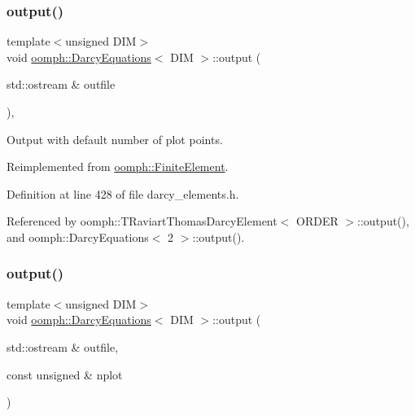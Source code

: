 \mbox{\label{classoomph_1_1DarcyEquations_ac523da40b92a26e3d32c1a5e985e0d40}} 
\subsubsection{\texorpdfstring{output()}{output()}\hspace{0.1cm}{\footnotesize\ttfamily [1/2]}}
{\footnotesize\ttfamily template$<$unsigned D\+IM$>$ \\
void \hyperlink{classoomph_1_1DarcyEquations}{oomph\+::\+Darcy\+Equations}$<$ D\+IM $>$\+::output (\begin{DoxyParamCaption}\item[{std\+::ostream \&}]{outfile }\end{DoxyParamCaption})\hspace{0.3cm}{\ttfamily [inline]}, {\ttfamily [virtual]}}



Output with default number of plot points. 



Reimplemented from \hyperlink{classoomph_1_1FiniteElement_a2ad98a3d2ef4999f1bef62c0ff13f2a7}{oomph\+::\+Finite\+Element}.



Definition at line 428 of file darcy\+\_\+elements.\+h.



Referenced by oomph\+::\+T\+Raviart\+Thomas\+Darcy\+Element$<$ O\+R\+D\+E\+R $>$\+::output(), and oomph\+::\+Darcy\+Equations$<$ 2 $>$\+::output().

\mbox{\label{classoomph_1_1DarcyEquations_afa8de4033583509bffda8b0b8b34d6de}} 
\subsubsection{\texorpdfstring{output()}{output()}\hspace{0.1cm}{\footnotesize\ttfamily [2/2]}}
{\footnotesize\ttfamily template$<$unsigned D\+IM$>$ \\
void \hyperlink{classoomph_1_1DarcyEquations}{oomph\+::\+Darcy\+Equations}$<$ D\+IM $>$\+::output (\begin{DoxyParamCaption}\item[{std\+::ostream \&}]{outfile,  }\item[{const unsigned \&}]{nplot }\end{DoxyParamCaption})\hspace{0.3cm}{\ttfamily [virtual]}}



